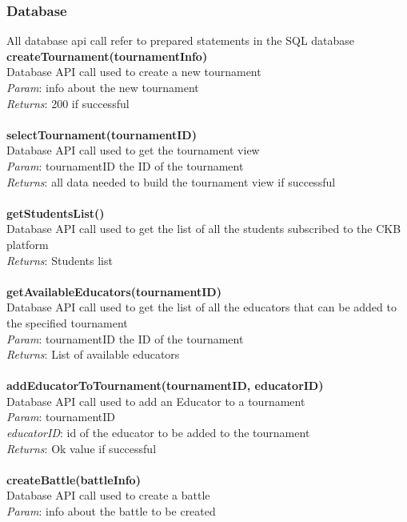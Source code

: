 \documentclass{article}
\begin{document}
\subsubsection{Database}
All database api call refer to prepared statements in the SQL database
\textbf{createTournament(tournamentInfo)}\\
Database API call used to create a new tournament\\
\textit{Param}: info about the new tournament\\
\textit{Returns}: 200 if successful\\
\\
\textbf{selectTournament(tournamentID)}\\
Database API call used to get the  tournament view\\
\textit{Param}: tournamentID the ID of the tournament\\
\textit{Returns}: all data needed to build the tournament view if successful\\
\\
\textbf{getStudentsList()}\\
Database API call used to get the list of all the students subscribed to the CKB platform\\
\textit{Returns}: Students list\\
\\
\textbf{getAvailableEducators(tournamentID)}\\
Database API call used to get the list of all the educators that can be added to the specified tournament\\
\textit{Param}: tournamentID the ID of the tournament\\
\textit{Returns}: List of available educators\\
\\
\textbf{addEducatorToTournament(tournamentID, educatorID)}\\
Database API call used to add an Educator to a tournament\\
\textit{Param}: tournamentID\\
\textit{educatorID}: id of the educator to be added to the tournament\\
\textit{Returns}: Ok value if successful\\
\\
\textbf{createBattle(battleInfo)}\\
Database API call used to create a battle\\
\textit{Param}: info about the battle to be created\\
\end{document}
